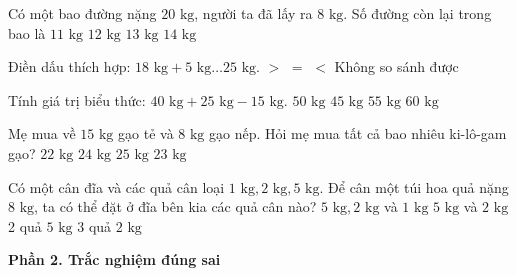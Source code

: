 \begin{ex} %
Có một bao đường nặng $20\text{ kg}$, người ta đã lấy ra $8\text{ kg}$. Số đường còn lại trong bao là
\choice
{$11\text{ kg}$}
{\True $12\text{ kg}$}
{$13\text{ kg}$}
{$14\text{ kg}$}
\end{ex}

\begin{ex} %
Điền dấu thích hợp: $18\text{ kg} + 5\text{ kg} \dots 25\text{ kg}$.
\choice
{$>$}
{$=$}
{\True $<$}
{Không so sánh được}
\end{ex}

\begin{ex} %
Tính giá trị biểu thức: $40\text{ kg} + 25\text{ kg} - 15\text{ kg}$.
\choice
{\True $50\text{ kg}$}
{$45\text{ kg}$}
{$55\text{ kg}$}
{$60\text{ kg}$}
\end{ex}

\begin{ex} %
Mẹ mua về $15\text{ kg}$ gạo tẻ và $8\text{ kg}$ gạo nếp. Hỏi mẹ mua tất cả bao nhiêu ki-lô-gam gạo?
\choice
{$22\text{ kg}$}
{$24\text{ kg}$}
{$25\text{ kg}$}
{\True $23\text{ kg}$}
\end{ex}

\begin{ex} %
Có một cân đĩa và các quả cân loại $1\text{ kg}, 2\text{ kg}, 5\text{ kg}$. Để cân một túi hoa quả nặng $8\text{ kg}$, ta có thể đặt ở đĩa bên kia các quả cân nào?
\choice
{\True $5\text{ kg}, 2\text{ kg}$ và $1\text{ kg}$}
{$5\text{ kg}$ và $2\text{ kg}$}
{2 quả $5\text{ kg}$}
{3 quả $2\text{ kg}$}
\end{ex}

\textbf{Phần 2. Trắc nghiệm đúng sai}

